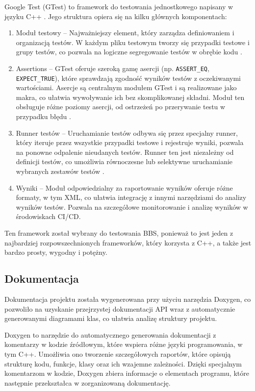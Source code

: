 Google Test (GTest) to framework do testowania jednostkowego napisany w języku C++ \cite{gtest}. Jego struktura opiera się na kilku głównych komponentach:

\begin{enumerate}
    \item Moduł testowy -- Najważniejszy element, który zarządza definiowaniem i organizacją testów. W każdym pliku testowym tworzy się przypadki testowe i grupy testów, co pozwala na logiczne segregowanie testów w obrębie kodu \cite{gtest_primer}.
    \item Assertions -- GTest oferuje szeroką gamę asercji (np. \texttt{ASSERT\_EQ}, \texttt{EXPECT\_TRUE}), które sprawdzają zgodność wyników testów z oczekiwanymi wartościami. Asercje są centralnym modułem GTest i są realizowane jako makra, co ułatwia wywoływanie ich bez skomplikowanej składni. Moduł ten obsługuje różne poziomy asercji, od ostrzeżeń po przerywanie testu w przypadku błędu \cite{gtest_primer}.
    \item Runner testów -- Uruchamianie testów odbywa się przez specjalny runner, który iteruje przez wszystkie przypadki testowe i rejestruje wyniki, pozwala na ponowne odpalenie nieudanych testów. Runner ten jest niezależny od definicji testów, co umożliwia równoczesne lub selektywne uruchamianie wybranych zestawów testów \cite{gtest}. 
    \item Wyniki -- Moduł odpowiedzialny za raportowanie wyników oferuje różne formaty, w tym XML, co ułatwia integrację z innymi narzędziami do analizy wyników testów. Pozwala na szczegółowe monitorowanie i analizę wyników w środowiskach CI/CD.
\end{enumerate}

Ten framework został wybrany do testowania BBS, ponieważ to jest jeden z najbardziej rozpowszechnionych frameworków, który korzysta z C++, a także jest bardzo prosty, wygodny i potężny.

\subsection{Dokumentacja}
Dokumentacja projektu została wygenerowana przy użyciu narzędzia Doxygen, co pozwoliło na uzyskanie przejrzystej dokumentacji API wraz z automatycznie generowanymi diagramami klas, co ułatwia analizę struktury projektu.

Doxygen to narzędzie do automatycznego generowania dokumentacji z komentarzy w kodzie źródłowym, które wspiera różne języki programowania, w tym C++. Umożliwia ono tworzenie szczegółowych raportów, które opisują strukturę kodu, funkcje, klasy oraz ich wzajemne zależności. Dzięki specjalnym komentarzom w kodzie, Doxygen zbiera informacje o elementach programu, które następnie przekształca w zorganizowaną dokumentację\cite{doxygen,doxygen_features}.

